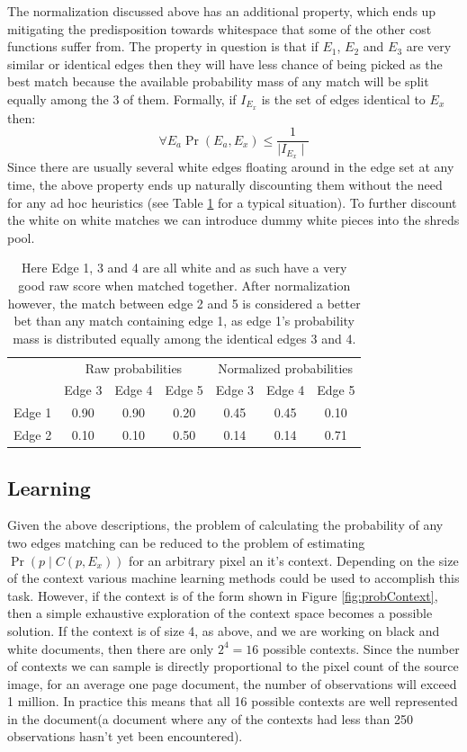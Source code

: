The normalization discussed above has an additional property, which ends up mitigating the predisposition towards whitespace that some of the other cost functions suffer from.  The property in question is that if \(E_1\), \(E_2\) and \(E_3\) are very similar or identical edges then they will have less chance of being picked as the best match because the available probability mass of any match will be split equally among the 3 of them. Formally, if \(I_{E_x}\) is the set of edges identical to \(E_x\) then: \[\forall E_a \Pr(E_a,E_x) \leq \frac{1}{\mid I_{E_x} \mid}\] Since there are usually several white edges floating around in the edge set at any time, the above property ends up naturally discounting them without the need for any ad hoc heuristics (see Table \ref{tab:normalization} for a typical situation). To further discount the white on white matches we can introduce dummy white pieces into the shreds pool.

\begin{table}[h]
  \centering
  \begin{tabular}{|c|c|c|c|c|c|c|}
    \hline
    & \multicolumn{3}{|c|}{Raw probabilities} &  \multicolumn{3}{|c|}{Normalized probabilities} \\
    \cline{2-7}
    & Edge 3 & Edge 4 & Edge 5 & Edge 3 & Edge 4 & Edge 5 \\
    \hline
    Edge 1 & 0.90 & 0.90 & 0.20 & 0.45 & 0.45 & 0.10 \\
    \hline
    Edge 2 & 0.10 & 0.10 & 0.50 & 0.14 & 0.14 & 0.71 \\
    \hline
  \end{tabular}
  \caption{Here Edge 1, 3 and 4 are all white and as such have a very good raw score when matched together. After normalization however, the match between edge 2 and 5 is considered a better bet than any match containing edge 1, as edge 1's probability mass is distributed equally among the identical edges 3 and 4.}
  \label{tab:normalization}
\end{table}

\subsection{Learning}
Given the above descriptions, the problem of calculating the probability of any two edges matching can be reduced to the problem of estimating \(\Pr( p \mid C(p,E_x) )\) for an arbitrary pixel an it's context. Depending on the size of the context various machine learning methods could be used to accomplish this task. However, if the context is of the form shown in Figure \ref{fig:probContext}, then a simple exhaustive exploration of the context space becomes a possible solution. If the context is of size 4, as above, and we are working on black and white documents, then there are only \(2^4 = 16\) possible contexts. Since the number of contexts we can sample is directly proportional to the pixel count of the source image, for an average one page document, the number of observations will exceed 1 million. In practice this means that all 16 possible contexts are well represented in the document(a document where any of the contexts had less than 250 observations hasn't yet been encountered).

